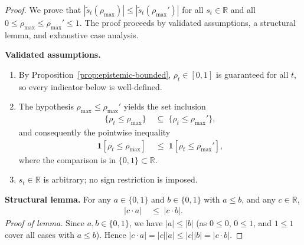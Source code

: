 \documentclass[12pt,openany]{book}
\numberwithin{equation}{chapter}
\theoremstyle{plain}
\theoremstyle{definition}
\theoremstyle{remark}
\numberwithin{equation}{chapter}
\theoremstyle{plain}
\begin{document}
\begin{proof}
We prove that $|\tilde{s}_t(\rho_{\max})| \leq |\tilde{s}_t(\rho_{\max}')|$
for all $s_t \in \mathbb{R}$ and all
$0 \leq \rho_{\max} \leq \rho_{\max}' \leq 1$.
The proof proceeds by validated assumptions, a structural lemma,
and exhaustive case analysis.

\medskip
\noindent\textbf{Validated assumptions.}
\begin{enumerate}
  \item By Proposition~\ref{prop:epistemic-bounded},
        $\rho_t \in [0,1]$ is guaranteed for all $t$, so
        every indicator below is well-defined.
  \item The hypothesis $\rho_{\max} \leq \rho_{\max}'$ yields the
        set inclusion
        \begin{align}
          \{\rho_t \leq \rho_{\max}\}
          &\;\subseteq\;
          \{\rho_t \leq \rho_{\max}'\},
          \label{eq:mono-subset}
        \end{align}
        and consequently the pointwise inequality
        \begin{align}
          \mathbf{1}[\rho_t \leq \rho_{\max}]
          &\;\leq\;
          \mathbf{1}[\rho_t \leq \rho_{\max}'],
          \label{eq:mono-ind-order}
        \end{align}
        where the comparison is in $\{0,1\} \subset \mathbb{R}$.
  \item $s_t \in \mathbb{R}$ is arbitrary; no sign restriction is
        imposed.
\end{enumerate}

\medskip
\noindent\textbf{Structural lemma.}
For any $a \in \{0,1\}$ and $b \in \{0,1\}$ with $a \leq b$,
and any $c \in \mathbb{R}$,
\begin{align}
  |c \cdot a| &\;\leq\; |c \cdot b|.
  \label{eq:struct-lemma}
\end{align}
\emph{Proof of lemma.}
Since $a,b \in \{0,1\}$, we have $|a| \leq |b|$ (as $0 \leq 0$,
$0 \leq 1$, and $1 \leq 1$ cover all cases with $a \leq b$).
Hence $|c \cdot a| = |c||a| \leq |c||b| = |c \cdot b|$.


\end{proof}
\end{document}
